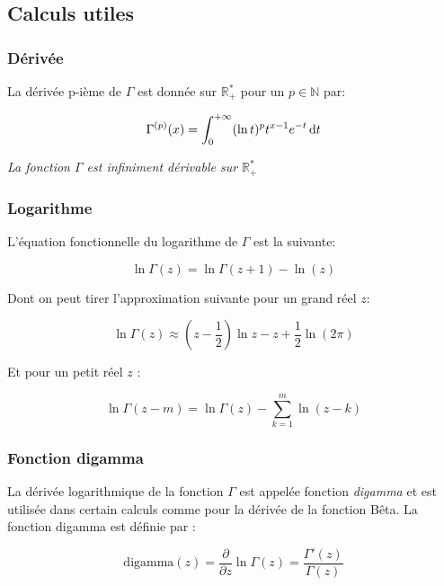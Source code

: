 \documentclass[french]{article}
\numberwithin{equation}{section}
\begin{document}
\subsection{Calculs utiles}

\subsubsection{Dérivée}

La dérivée p-ième de $\Gamma$ est donnée sur $\mathbb{R}_+^*$ pour un $p \in \mathbb{N}$ par:

\begin{equation}
\Gamma^{(p)}(x) = \int_{0}^{+\infty} (\ln t)^p t^{x - 1} e^{-t} \operatorname{d \!} t
\end{equation}

\textit{La fonction $\Gamma$ est infiniment dérivable sur $\mathbb{R}_+^*$}

\subsubsection{Logarithme}

L'équation fonctionnelle du logarithme de $\Gamma$ est la suivante:

\begin{equation}
\ln \Gamma(z) = \ln \Gamma(z + 1) - \ln(z)
\end{equation}

Dont on peut tirer l'approximation suivante pour un grand réel $z$:

\begin{equation}
\ln \Gamma(z) \approx (z - \frac{1}{2}) \ln z - z + \frac{1}{2} \ln(2\pi)
\end{equation}

Et pour un petit réel $z$ :

\begin{equation}
\ln \Gamma(z - m) = \ln \Gamma(z) - \sum_{k=1}^{m} \ln (z - k)
\end{equation}

\subsubsection{Fonction digamma}

La dérivée logarithmique de la fonction $\Gamma$ est appelée fonction \textit{digamma} et est utilisée dans certain calculs comme pour la dérivée de la fonction Bêta. La fonction digamma est définie par :

\begin{equation}
\label{digamma}
\text{digamma}(z) = \frac{\partial}{\partial z} \ln \Gamma(z) = \frac{\Gamma'(z)}{\Gamma(z)}
\end{equation}
\end{document}
